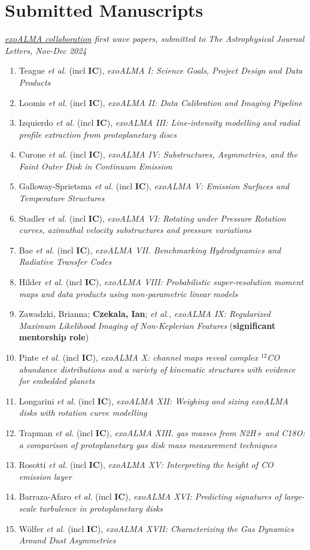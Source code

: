 \section*{Submitted Manuscripts}
\emph{\href{https://www.exoalma.com/}{exoALMA collaboration} first wave papers, submitted to The Astrophysical Journal Letters, Nov-Dec 2024}
\begin{enumerate}
\item Teague \emph{et al.} (incl \textbf{IC}), \emph{exoALMA I: Science Goals, Project Design and Data Products}
\item Loomis \emph{et al.} (incl \textbf{IC}), \emph{exoALMA II: Data Calibration and Imaging Pipeline}
\item Izquierdo \emph{et al.} (incl \textbf{IC}), \emph{exoALMA III: Line-intensity modelling and radial profile extraction from protoplanetary discs}
\item Curone \emph{et al.} (incl \textbf{IC}), \emph{exoALMA IV: Substructures, Asymmetries, and the Faint Outer Disk in Continuum Emission}
\item Galloway-Sprietsma \emph{et al.} (incl \textbf{IC}), \emph{exoALMA V: Emission Surfaces and Temperature Structures}
\item Stadler \emph{et al.} (incl \textbf{IC}), \emph{exoALMA VI: Rotating under Pressure Rotation curves, azimuthal velocity substructures and pressure variations}
\item Bae \emph{et al.} (incl \textbf{IC}), \emph{exoALMA VII. Benchmarking Hydrodynamics and Radiative Transfer Codes}
\item Hilder \emph{et al.} (incl \textbf{IC}), \emph{exoALMA VIII: Probabilistic super-resolution moment maps and data products using non-parametric linear models}
\item Zawadzki, Brianna; \textbf{Czekala, Ian}; \emph{et al.}, \emph{exoALMA IX: Regularized Maximum Likelihood Imaging of Non-Keplerian Features} (\textbf{significant mentorship role})
\item Pinte \emph{et al.} (incl \textbf{IC}), \emph{exoALMA X: channel maps reveal complex $^{12}$CO abundance distributions and a variety of kinematic structures with evidence for embedded planets}
\item Longarini \emph{et al.} (incl \textbf{IC}), \emph{exoALMA XII: Weighing and sizing exoALMA disks with rotation curve modelling}
\item Trapman \emph{et al.} (incl \textbf{IC}), \emph{exoALMA XIII. gas masses from N2H+ and C18O: a comparison of protoplanetary gas disk mass measurement techniques}
\item Rosotti \emph{et al.} (incl \textbf{IC}), \emph{exoALMA XV: Interpreting the height of CO emission layer}
\item Barraza-Afaro \emph{et al.} (incl \textbf{IC}), \emph{exoALMA XVI: Predicting signatures of large-scale turbulence in protoplanetary disks} 
\item W\"{o}lfer \emph{et al.} (incl \textbf{IC}), \emph{exoALMA XVII: Characterizing the Gas Dynamics Around Dust Asymmetries}
\end{enumerate}